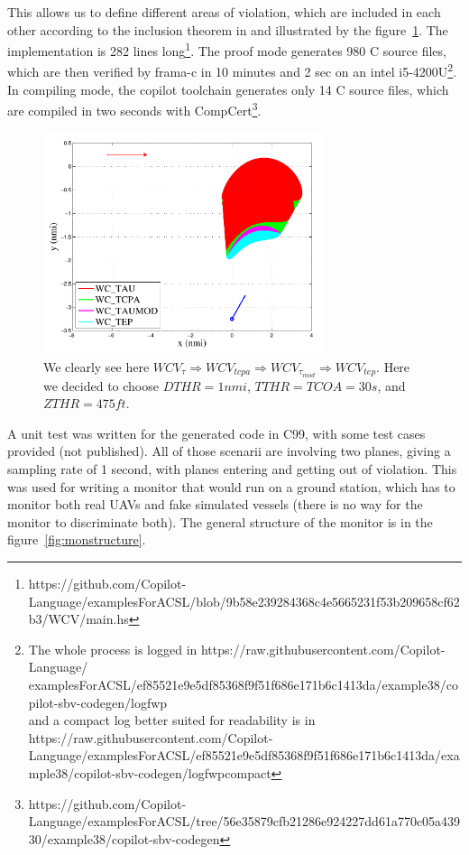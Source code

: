 \documentclass[a4paper,11pt,final]{article}
\begin{document}
	This allows us to define different areas of violation, which are included in each other according to the inclusion theorem in \cite{WCV1} and illustrated by the figure~\ref{fig:graph}. The implementation is 282 lines long\footnote{https://github.com/Copilot-Language/examplesForACSL/blob/9b58e239284368c4e5665231f53b209658cf62b3/WCV/main.hs}. The proof mode generates 980 C source files, which are then verified by frama-c in 10 minutes and 2 sec on an intel i5-4200U\footnote{The whole process is logged in  https://raw.githubusercontent.com/Copilot-Language/\\examplesForACSL/ef85521e9e5df85368f9f51f686e171b6c1413da/example38/copilot-sbv-codegen/logfwp \\ and a compact log better suited for readability is in  https://raw.githubusercontent.com/Copilot-Language/examplesForACSL/ef85521e9e5df85368f9f51f686e171b6c1413da/example38/copilot-sbv-codegen/logfwpcompact}. In compiling mode, the copilot toolchain generates only 14 C source files, which are compiled in two seconds with CompCert\footnote{https://github.com/Copilot-Language/examplesForACSL/tree/56e35879cfb21286e924227dd61a770c05a43930/example38/copilot-sbv-codegen}.
	
	\begin{figure}[!ht]
		\centering
		\includegraphics[height=65mm]{images/WCV/graph.pdf}
		\caption{We clearly see here $WCV_{\tau} \Rightarrow WCV_{tcpa} \Rightarrow WCV_{\tau_{mod}} \Rightarrow WCV_{tep}$. Here we decided to choose $DTHR = 1 nmi$, $TTHR = TCOA = 30 s$, and $ZTHR = 475 ft$. }
		\label{fig:graph}
	\end{figure} 
	
	A unit test was written for the generated code in C99, with some test cases provided (not published). All of those scenarii are involving two planes, giving a sampling rate of 1 second, with planes entering and getting out of violation. This was used for writing a monitor that would run on a ground station, which has to monitor both real UAVs and fake simulated vessels (there is no way for the monitor to discriminate both). The general structure of the monitor is in the figure~\ref{fig:monstructure}. 
	
\end{document}

